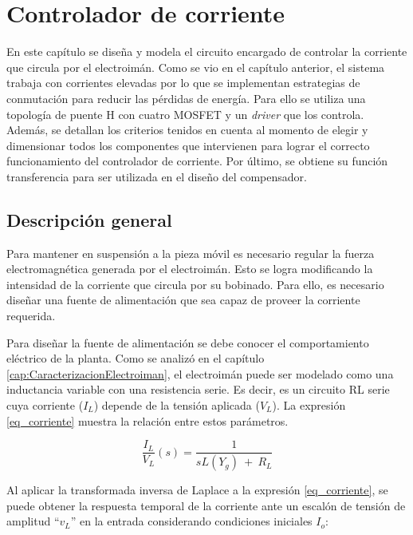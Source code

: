 \chapter{Controlador de corriente}  \label{cap:ControladorCorriente}

En este capítulo se diseña y modela el circuito encargado de controlar la corriente que circula por el electroimán. Como se vio en el capítulo anterior, el sistema trabaja con corrientes elevadas por lo que se implementan estrategias de conmutación para reducir las pérdidas de energía. Para ello se utiliza una topología de puente H con cuatro MOSFET y un \textsl{driver} que los controla. Además, se detallan los criterios tenidos en cuenta al momento de  elegir  y dimensionar todos los componentes que intervienen para lograr el correcto funcionamiento del controlador de corriente. Por último, se obtiene su función transferencia  para ser utilizada en el diseño del compensador.

\section{Descripción general}\label{sec_descripcion-general}

Para mantener en suspensión a la pieza móvil es necesario regular la fuerza electromagnética generada por el electroimán. Esto se logra modificando la intensidad de la corriente que circula por su bobinado. Para ello, es necesario diseñar una fuente de alimentación que sea capaz de proveer la corriente requerida.

Para diseñar la fuente de alimentación se debe conocer el comportamiento eléctrico de la planta. Como se analizó en el capítulo \ref{cap:CaracterizacionElectroiman}, el electroimán puede ser modelado como una inductancia variable con una resistencia serie. Es decir, es un circuito RL serie cuya corriente ($I_L$) depende de la tensión aplicada ($V_L$). La expresión \ref{eq_corriente} muestra la relación entre estos parámetros.

\begin{equation} \label{eq_corriente}
\frac{I_L}{V_L}(s)=\frac{1}{sL(Y_g)\ +\ R_L}
\end{equation}

Al aplicar la transformada inversa de Laplace a la expresión  \ref{eq_corriente}, se puede obtener la respuesta temporal de la corriente ante un escalón de tensión de amplitud ``$v_L$'' en la entrada considerando condiciones iniciales $I_o$:

